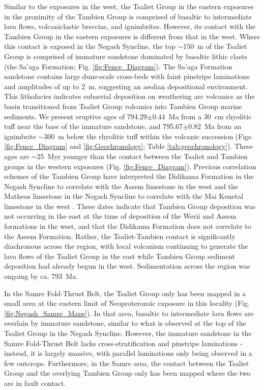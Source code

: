 \documentclass[11pt,letterpaper]{article}
\begin{document}
Similar to the exposures in the west, the Tsaliet Group in the eastern exposures in the proximity of the Tambien Group is comprised of basaltic to intermediate lava flows, volcaniclastic breccias, and ignimbrites. However, its contact with the Tambien Group in the eastern exposures is different from that in the west. Where this contact is exposed in the Negash Syncline, the top $\sim$150~m of the Tsaliet Group is comprised of immature sandstone dominated by basaltic lithic clasts (the Sa'aga Formation; Fig. \ref{fig:Fence_Diagram}). The Sa'aga Formation sandstone contains large dune-scale cross-beds with faint pinstripe laminations and amplitudes of up to 2~m, suggesting an aeolian depositional environment. This lithofacies indicates subaerial deposition on weathering arc volcanics as the basin transitioned from Tsaliet Group volcanics into Tambien Group marine sediments. We present eruptive ages of 794.29$\pm$0.44~Ma from a 30~cm rhyolitic tuff near the base of the immature sandstone, and 795.67$\pm$0.82~Ma from an ignimbrite $\sim$300~m below the rhyolitic tuff within the volcanic succession (Figs. \ref{fig:Fence_Diagram} and \ref{fig:Geochronology}; Table \ref{tab:geochronology}). These ages are $\sim$25~Myr younger than the contact between the Tsaliet and Tambien groups in the western exposures (Fig. \ref{fig:Fence_Diagram}). Previous correlation schemes of the Tambien Group have interpreted the Didikama Formation in the Negash Syncline to correlate with the Assem limestone in the west and the Matheos limestone in the Negash Syncline to correlate with the Mai Kenetal limestone in the west \citep{Alene2006a, Miller2009a}. These dates indicate that Tambien Group deposition was not occurring in the east at the time of deposition of the Werii and Assem formations in the west, and that the Didikama Formation does not correlate to the Assem Formation. Rather, the Tsaliet-Tambien contact is significantly diachronous across the region, with local volcanism continuing to generate the lava flows of the Tsaliet Group in the east while Tambien Group sediment deposition had already begun in the west. Sedimentation across the region was ongoing by ca. 793~Ma.

In the Samre Fold-Thrust Belt, the Tsaliet Group only has been mapped in a small area at the eastern limit of Neoproterozoic exposure in this locality (Fig. \ref{fig:Negash_Samre_Maps}). In that area, basaltic to intermediate lava flows are overlain by immature sandstone, similar to what is observed at the top of the Tsaliet Group in the Negash Syncline. However, the immature sandstone in the Samre Fold-Thrust Belt lacks cross-stratification and pinstripe laminations - instead, it is largely massive, with parallel laminations only being observed in a few outcrops. Furthermore, in the Samre area, the contact between the Tsaliet Group and the overlying Tambien Group only has been mapped where the two are in fault contact.
\end{document}
